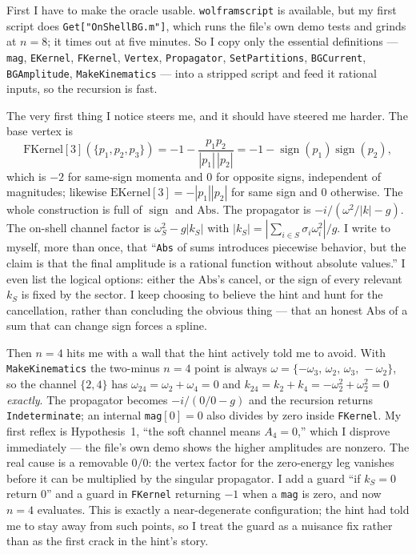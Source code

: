 \documentclass{article}
\begin{document}
First I have to make the oracle usable. \texttt{wolframscript} is available, but
my first script does \texttt{Get["OnShellBG.m"]}, which runs the file's own demo
tests and grinds at $n=8$; it times out at five minutes. So I copy only the
essential definitions --- \texttt{mag}, \texttt{EKernel}, \texttt{FKernel},
\texttt{Vertex}, \texttt{Propagator}, \texttt{SetPartitions}, \texttt{BGCurrent},
\texttt{BGAmplitude}, \texttt{MakeKinematics} --- into a stripped script and feed
it rational inputs, so the recursion is fast.

The very first thing I notice steers me, and it should have steered me harder. The
base vertex is
\[
\text{FKernel}[3](\{p_1,p_2,p_3\})
= -1-\frac{p_1p_2}{|p_1|\,|p_2|}
= -1-\operatorname{sign}(p_1)\operatorname{sign}(p_2),
\]
which is $-2$ for same-sign momenta and $0$ for opposite signs, independent of
magnitudes; likewise $\text{EKernel}[3]=-|p_1||p_2|$ for same sign and $0$
otherwise. The whole construction is full of $\operatorname{sign}$ and
$\mathrm{Abs}$. The propagator is $-i/(\omega^2/|k|-g)$. The on-shell channel
factor is $\omega_S^2-g|k_S|$ with $|k_S|=|\sum_{i\in S}\sigma_i\omega_i^2|/g$.
I write to myself, more than once, that ``\texttt{Abs} of sums introduces
piecewise behavior, but the claim is that the final amplitude is a rational
function without absolute values.'' I even list the logical options: either the
$\mathrm{Abs}$'s cancel, or the sign of every relevant $k_S$ is fixed by the
sector. I keep choosing to believe the hint and hunt for the cancellation, rather
than concluding the obvious thing --- that an honest $\mathrm{Abs}$ of a sum that
can change sign forces a spline.

Then $n=4$ hits me with a wall that the hint actively told me to avoid. With
\texttt{MakeKinematics} the two-minus $n=4$ point is always
$\omega=\{-\omega_3,\,\omega_2,\,\omega_3,\,-\omega_2\}$, so the channel
$\{2,4\}$ has $\omega_{24}=\omega_2+\omega_4=0$ and
$k_{24}=k_2+k_4=-\omega_2^2+\omega_2^2=0$ \emph{exactly}. The propagator becomes
$-i/(0/0-g)$ and the recursion returns \texttt{Indeterminate}; an internal
\texttt{mag}$[0]=0$ also divides by zero inside \texttt{FKernel}. My first
reflex is Hypothesis~1, ``the soft channel means $A_4=0$,'' which I disprove
immediately --- the file's own demo shows the higher amplitudes are nonzero. The
real cause is a removable $0/0$: the vertex factor for the zero-energy leg
vanishes before it can be multiplied by the singular propagator. I add a guard
``if $k_S=0$ return $0$'' and a guard in \texttt{FKernel} returning $-1$ when a
\texttt{mag} is zero, and now $n=4$ evaluates. This is exactly a near-degenerate
configuration; the hint had told me to stay away from such points, so I treat the
guard as a nuisance fix rather than as the first crack in the hint's story.
\end{document}
